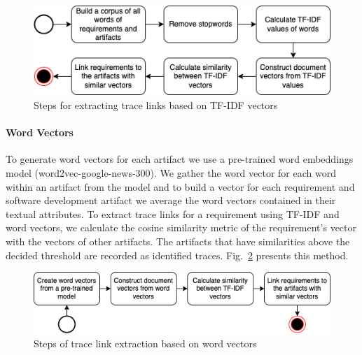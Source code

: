       \begin{figure}[htb]
        \centering
        \includegraphics[width=0.99\linewidth]{figs/tfidfvector2.png}
        \caption{Steps for extracting trace links based on TF-IDF vectors}
        \label{fig:tfidfvec}
      \end{figure}

      \paragraph{Word Vectors} To generate word vectors for each artifact we use a pre-trained word embeddings model (word2vec-google-news-300). We gather the word vector for each word within an artifact from the model and to build a vector for each requirement and software development artifact we average the word vectors contained in their textual attributes. To extract trace links for a requirement using TF-IDF and word vectors, we calculate the cosine similarity metric of the requirement's vector with the vectors of other artifacts. The artifacts that have similarities above the decided threshold are recorded as identified traces. Fig.~\ref{fig:wordvec} presents this method.

       \begin{figure}[htb]
        \centering
        \includegraphics[width=0.99\linewidth]{figs/wordvector.png}
        \caption{Steps of trace link extraction based on word vectors}
        \label{fig:wordvec}
      \end{figure}



